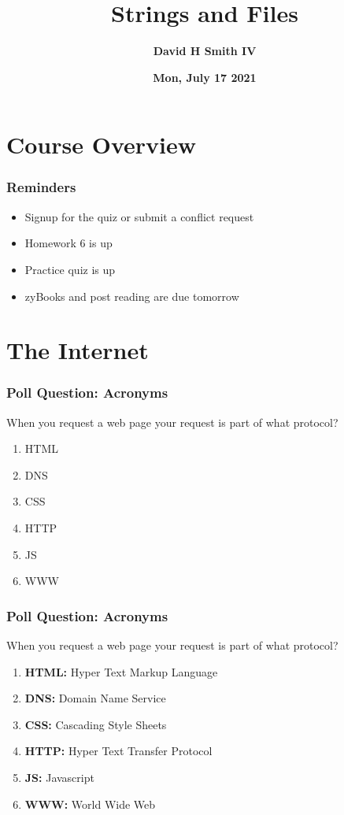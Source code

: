 \documentclass{beamer}
\title{\textbf{Strings and Files}}
\author{\textbf{David H Smith IV}}
\institute[\textbf{UIUC}]{\textbf{University of Illinois Urbana-Champaign}}
\date{\textbf{Mon, July 17 2021}}
\begin{document}
\frame{\titlepage}

\section{Course Overview}

%
%
\begin{frame}
  \frametitle{Reminders}
  \begin{itemize}
    \item Signup for the quiz or submit a conflict request
    \item Homework 6 is up 
    \item Practice quiz is up
    \item zyBooks and post reading are due tomorrow
  \end{itemize}
\end{frame}

\section{The Internet}

%
%
\begin{frame}[fragile]
  \frametitle{Poll Question: Acronyms}
  When you request a web page your request is part of what protocol?
  \vfill
  \begin{enumerate}[A]
    \item HTML
    \item DNS
    \item CSS
    \item HTTP
    \item JS
    \item WWW
  \end{enumerate}
\end{frame}

%
%
\begin{frame}[fragile]
  \frametitle{Poll Question: Acronyms}
  When you request a web page your request is part of what protocol?
  \vfill
  \begin{enumerate}[A]
    \item \textbf{HTML:} Hyper Text Markup Language
    \item \textbf{DNS:} Domain Name Service
    \item \textbf{CSS:} Cascading Style Sheets
    \item \textbf{HTTP:} Hyper Text Transfer Protocol
    \item \textbf{JS:} Javascript
    \item \textbf{WWW:} World Wide Web
  \end{enumerate}
\end{frame}
\end{document}

